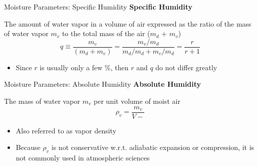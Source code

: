 
\begin{frame}{Moisture Parameters: Specific Humidity}
\textbf{Specific Humidity}
\begin{fancydefs}
	The amount of water vapor in a volume of air expressed as the ratio of the mass of water vapor $m_v$ to the total mass of the air ($m_d$ + $m_v$)
	$$q \equiv \frac{m_v}{(m_d+m_v)} = \frac{m_v/m_d}{m_d/m_d + m_v/m_d} = \frac{r}{r+1}$$
\end{fancydefs}
\begin{itemize}
	\item Since $r$ is usually only a few $\%$, then $r$ and $q$ do not differ greatly
\end{itemize}
\end{frame}


\begin{frame}{Moisture Parameters: Absolute Humidity}
\textbf{Absolute Humidity}
\begin{fancydefs}
	The mass of water vapor $m_v$ per unit volume of moist air
	$$\rho_v = \frac{m_v}{V\!\!\!\!\!-}$$
\end{fancydefs}
\begin{itemize}
	\item Also referred to as vapor density
	\item Because $\rho_v$ is not conservative w.r.t. adiabatic expansion or compression, it is not commonly used in atmospheric sciences
\end{itemize}
\end{frame}


